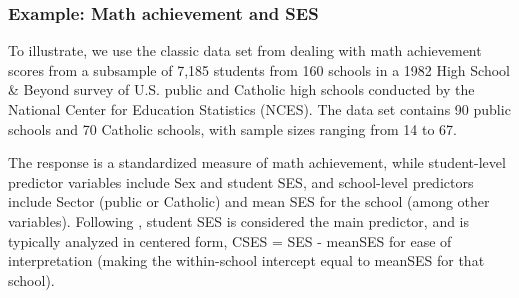 \subsubsection{Example: Math achievement and SES}

To illustrate, we use the classic data set from %
\citet{BrykRaudenbush:1992,RaudenbushBryk:2002}
dealing with math achievement scores from a subsample of 7,185 students from 160 schools
in a 1982 High School \& Beyond survey of U.S. public and Catholic high
schools conducted by the National Center for Education Statistics (NCES).
The data set contains 90 public schools and 70 Catholic schools, with
sample sizes ranging from 14 to 67.

The response is a standardized measure of math achievement, while
student-level predictor variables include Sex and student SES, and
school-level predictors include Sector (public or Catholic) and mean SES for the
school (among other variables).
Following \citet{RaudenbushBryk:2002}, student SES is considered the main predictor, and is 
typically analyzed in centered form,
CSES = SES - meanSES for ease of interpretation (making the within-school intercept
equal to meanSES for that school).



